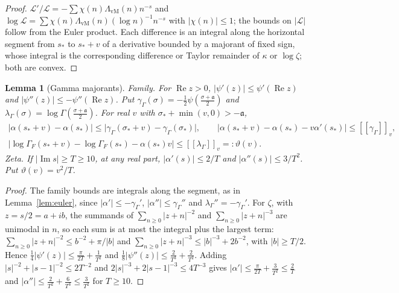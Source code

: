 \documentclass[11pt]{article}
\newtheorem{lemma}[theorem]{Lemma}
\theoremstyle{definition}
\theoremstyle{remark}
\newcommand{\cL}{\mathcal L}
\newcommand{\fa}{\mathfrak a}
\newcommand{\Rem}[1]{[\![#1]\!]}
\newcommand{\re}{\operatorname{Re}}
\newcommand{\im}{\operatorname{Im}}
\numberwithin{equation}{section}
\begin{document}
\begin{proof}
$\cL'/\cL=-\sum\chi(n)\Lambda_{\mathrm{vM}}(n)n^{-s}$ and
$\log\cL=\sum\chi(n)\Lambda_{\mathrm{vM}}(n)(\log n)^{-1}n^{-s}$ with
$\lvert\chi(n)\rvert\le1$; the bounds on $\lvert\cL\rvert$ follow from the
Euler product. Each difference is an integral along the horizontal segment
from $s_*$ to $s_*+v$ of a derivative bounded by a majorant of fixed sign,
whose integral is the corresponding difference or Taylor remainder of
$\kappa$ or $\log\zeta$; both are convex.
\end{proof}

\begin{lemma}[Gamma majorants]\label{lem:gamma}
\emph{Family.} For $\re z>0$, $\lvert\psi'(z)\rvert\le\psi'(\re z)$ and
$\lvert\psi''(z)\rvert\le-\psi''(\re z)$. Put
$\gamma_\Gamma(\sigma)=-\frac12\psi(\frac{\sigma+\fa}2)$ and
$\lambda_\Gamma(\sigma)=\log\Gamma(\frac{\sigma+\fa}2)$. For real $v$ with
$\sigma_*+\min(v,0)>-\fa$,
\begin{gather*}
\lvert\alpha(s_*+v)-\alpha(s_*)\rvert\le\lvert\gamma_\Gamma(\sigma_*+v)-\gamma_\Gamma(\sigma_*)\rvert,\qquad
\lvert\alpha(s_*+v)-\alpha(s_*)-v\alpha'(s_*)\rvert\le\Rem{\gamma_\Gamma}_v,\\
\lvert\log\Gamma_F(s_*+v)-\log\Gamma_F(s_*)-\alpha(s_*)v\rvert\le\Rem{\lambda_\Gamma}_v=:\vartheta(v).
\end{gather*}
\emph{Zeta.} If $\lvert\im s\rvert\ge T\ge10$, at any real part,
$\lvert\alpha'(s)\rvert\le2/T$ and $\lvert\alpha''(s)\rvert\le3/T^2$. Put
$\vartheta(v)=v^2/T$.
\end{lemma}

\begin{proof}
The family bounds are integrals along the segment, as in
Lemma~\ref{lem:euler}, since $\lvert\alpha'\rvert\le-\gamma_\Gamma'$,
$\lvert\alpha''\rvert\le\gamma_\Gamma''$ and $\lambda_\Gamma''=-\gamma_\Gamma'$.
For $\zeta$, with $z=s/2=a+ib$, the summands of
$\sum_{n\ge0}\lvert z+n\rvert^{-2}$ and $\sum_{n\ge0}\lvert z+n\rvert^{-3}$ are
unimodal in $n$, so each sum is at most the integral plus the largest term:
$\sum_{n\ge0}\lvert z+n\rvert^{-2}\le b^{-2}+\pi/\lvert b\rvert$ and
$\sum_{n\ge0}\lvert z+n\rvert^{-3}\le\lvert b\rvert^{-3}+2b^{-2}$, with
$\lvert b\rvert\ge T/2$. Hence
$\frac14\lvert\psi'(z)\rvert\le\frac\pi{2T}+\frac1{T^2}$ and
$\frac18\lvert\psi''(z)\rvert\le\frac2{T^3}+\frac2{T^2}$. Adding
$\lvert s\rvert^{-2}+\lvert s-1\rvert^{-2}\le2T^{-2}$ and
$2\lvert s\rvert^{-3}+2\lvert s-1\rvert^{-3}\le4T^{-3}$ gives
$\lvert\alpha'\rvert\le\frac\pi{2T}+\frac3{T^2}\le\frac2T$ and
$\lvert\alpha''\rvert\le\frac2{T^2}+\frac6{T^3}\le\frac3{T^2}$ for $T\ge10$.
\end{proof}
\end{document}
